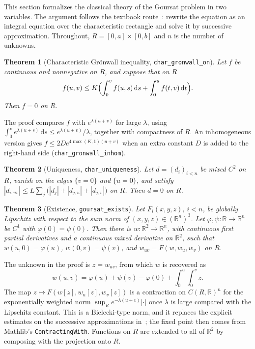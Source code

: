 \documentclass[pdflatex,sn-mathphys-num]{sn-jnl}%
\theoremstyle{thmstyleone}%
\newtheorem{theorem}{Theorem}%
\theoremstyle{thmstyletwo}%
\theoremstyle{thmstylethree}%
\newcommand{\lean}[1]{\texttt{#1}}
\newcommand{\R}{\mathbb{R}}
\newcommand{\dd}{\mathrm{d}}
\begin{document}
This section formalizes the classical theory of the Goursat problem in two variables. The argument follows the textbook route~\cite{Garabedian1964,CourantHilbert1962}: rewrite the equation as an integral equation over the characteristic rectangle and solve it by successive approximation. Throughout, $R=[0,a]\times[0,b]$ and $n$ is the number of unknowns.

\begin{theorem}[Characteristic Gr\"onwall inequality, \lean{char\_gronwall\_on}]\label{thm:gronwall}
Let $f$ be continuous and nonnegative on $R$, and suppose that on $R$
\[
f(u,v)\le K\Bigl(\int_0^vf(u,s)\,\dd s+\int_0^uf(t,v)\,\dd t\Bigr).
\]
Then $f=0$ on $R$.
\end{theorem}

The proof compares $f$ with $e^{\lambda(u+v)}$ for large $\lambda$, using $\int_0^ve^{\lambda(u+s)}\,\dd s\le e^{\lambda(u+v)}/\lambda$, together with compactness of $R$. An inhomogeneous version gives $f\le2De^{4\max(K,1)(u+v)}$ when an extra constant $D$ is added to the right-hand side (\lean{char\_gronwall\_inhom}).

\begin{theorem}[Uniqueness, \lean{char\_uniqueness}]\label{thm:charuniq}
Let $d=(d_i)_{i<n}$ be mixed $C^2$ on $R$, vanish on the edges $\{v=0\}$ and $\{u=0\}$, and satisfy $|d_{i,uv}|\le L\sum_j\bigl(|d_j|+|d_{j,u}|+|d_{j,v}|\bigr)$ on $R$. Then $d=0$ on $R$.
\end{theorem}

\begin{theorem}[Existence, \lean{goursat\_exists}]\label{thm:existence}
Let $F_i(x,y,z)$, $i<n$, be globally Lipschitz with respect to the sum norm of $(x,y,z)\in(\R^n)^3$. Let $\varphi,\psi:\R\to\R^n$ be $C^1$ with $\varphi(0)=\psi(0)$. Then there is $w:\R^2\to\R^n$, with continuous first partial derivatives and a continuous mixed derivative on $\R^2$, such that $w(u,0)=\varphi(u)$, $w(0,v)=\psi(v)$, and $w_{uv}=F(w,w_u,w_v)$ on $R$.
\end{theorem}

The unknown in the proof is $z=w_{uv}$, from which $w$ is recovered as
\[
w(u,v)=\varphi(u)+\psi(v)-\varphi(0)+\int_0^u\!\!\int_0^vz.
\]
The map $z\mapsto F(w[z],w_u[z],w_v[z])$ is a contraction on $C(R,\R)^n$ for the exponentially weighted norm $\sup_Re^{-\lambda(u+v)}|\cdot|$ once $\lambda$ is large compared with the Lipschitz constant. This is a Bielecki-type norm, and it replaces the explicit estimates on the successive approximations in~\cite{Garabedian1964,CourantHilbert1962}; the fixed point then comes from Mathlib's \lean{ContractingWith}. Functions on $R$ are extended to all of $\R^2$ by composing with the projection onto $R$.
\end{document}
